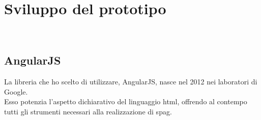 
\chapter{Sviluppo del prototipo}
\label{cap:sviluppo-prototipo}

\\

\section{AngularJS}
\label{sec:AngularJS}

La libreria che ho scelto di utilizzare, AngularJS, nasce nel 2012 nei laboratori di Google.\\
Esso potenzia l'aspetto dichiarativo del linguaggio \gls{html}, offrendo al contempo tutti gli strumenti necessari alla realizzazione di \gls{spag}. 
